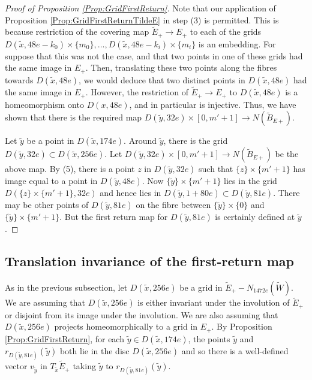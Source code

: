 \documentclass[oneside]{amsart}
\numberwithin{equation}{section}
\theoremstyle{plain}
\theoremstyle{definition}
\begin{document}
\begin{proof}[Proof of Proposition \ref{Prop:GridFirstReturn}]
Note that our application of Proposition \ref{Prop:GridFirstReturnTildeE} in step (3) is permitted. This is because restriction of the
covering map $\tilde E_+ \rightarrow E_+$ to each of the grids $D(\tilde x, 48e - k_0) \times  \{ m_0\}, \dots,  D(\tilde x, 48e - k_i) \times  \{ m_i\}$ 
is an embedding. For suppose that this was not the case, and that two points in one of these grids had the same
image in $E_+$. Then, translating these two points along the fibres towards $D(\tilde x, 48e)$, we would deduce that two distinct
points in $D(\tilde x, 48e)$ had the same image in $E_+$. However, the restriction of $\tilde E_+ \rightarrow E_+$ to $D(\tilde x, 48e)$
is a homeomorphism onto $D(x, 48e)$, and in particular is injective. Thus, we have shown that there is
the required map $D(\tilde y, 32e) \times [0,m'+1] \rightarrow N(\tilde B_{E+})$.

Let $\tilde y$ be a point in $D(\tilde x, 174e)$. Around $\tilde y$, there is the grid $D(\tilde y, 32e) \subset D(\tilde x, 256e)$. Let 
$D(\tilde y, 32 e) \times [0,m'+1] \rightarrow N(\tilde B_{E+})$ be the above map. By
(5), there is a point $z$ in $D(\tilde y, 32e)$ such that $\{ z \} \times \{ m'+1 \}$
has image equal to a point in $D(\tilde y, 48e)$. Now $\{ \tilde y \} \times \{ m'+1 \}$ lies in the grid $D(\{ z \} \times \{ m'+1 \}, 32e)$ and
hence lies in $D(\tilde y, 1+80e) \subset D(\tilde y, 81e)$. There may be other points of $D(\tilde y, 81e)$ on the fibre between $\{ \tilde y \} \times \{0 \}$ and 
$\{ \tilde y \} \times \{ m'+1 \}$. But the first return map for $D(\tilde y, 81e)$ is certainly defined at $\tilde y$.
\end{proof}

\subsection{Translation invariance of the first-return map}

As in the previous subsection, let $D(\tilde x, 256e)$ be a grid in $\tilde E_+ - N_{1472e}(\tilde W)$. We are assuming that
$D(\tilde x, 256e)$ is either invariant under the involution of $\tilde E_+$ or disjoint from its image under the involution.
We are also assuming that $D(\tilde x, 256e)$ projects homeomorphically to a grid in $E_+$.
By Proposition \ref{Prop:GridFirstReturn},
for each $\tilde y \in D(\tilde x, 174e)$, the points $\tilde y$ and $r_{D(\tilde y,81e)}(\tilde y)$ both lie in the
disc $D(\tilde x, 256e)$ and so there is a well-defined vector $v_{\tilde y}$ in $T_{\tilde x} \tilde E_+$ taking $\tilde y$ to $r_{D(\tilde y,81e)}(\tilde y)$.
\end{document}
